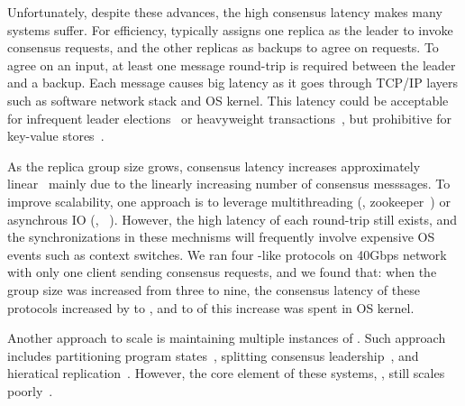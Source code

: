 Unfortunately, despite these advances, the high \paxos consensus latency makes 
many systems suffer. For efficiency, \paxos typically assigns one replica as 
the leader to invoke consensus requests, and the other replicas as backups to 
agree on requests. To agree on an input, at least one message round-trip is 
required between the leader and a backup. Each message causes big latency as it 
goes through TCP/IP layers such as software network stack and OS kernel. This 
latency could be acceptable for infrequent 
leader elections~\cite{chubby:osdi,zookeeper} or 
heavyweight transactions~\cite{crane:sosp15,eve:osdi12}, but prohibitive for 
key-value stores~\cite{redis,memcached}.


As the replica group size grows, \paxos consensus latency increases 
approximately linear~\cite{scatter:sosp11} mainly due to the linearly 
increasing number of consensus messsages. To improve scalability, one approach 
is to leverage multithreading (\eg, zookeeper~\cite{zookeeper}) or asynchrous 
IO (\eg, \crane~\cite{crane:sosp15}). However, the high latency of each 
round-trip still exists, and the synchronizations in these mechnisms will 
frequently involve expensive OS events such as context switches. We ran four 
\paxos-like protocols on 40Gbps network with only one client sending consensus 
requests, and we found that: when the group size was increased from three to 
nine, the consensus latency of these protocols increased by 
\tradlatencyincreaselow to \tradlatencyincreasehigh, and \systemcostlow to 
\systemcosthigh of this increase was spent in OS kernel. 

Another approach to scale \paxos is maintaining multiple instances of \paxos. 
Such approach includes partitioning program 
states~\cite{scatter:sosp11,dssmr,ssmr}, splitting consensus 
leadership~\cite{mencius:osdi08,spaxos}, and hieratical 
replication~\cite{manos:hotdep10,scatter:sosp11}. However, the core element of 
these systems, \paxos, still scales 
poorly~\cite{ellis:thesis,scatter:sosp11,manos:hotdep10}.

